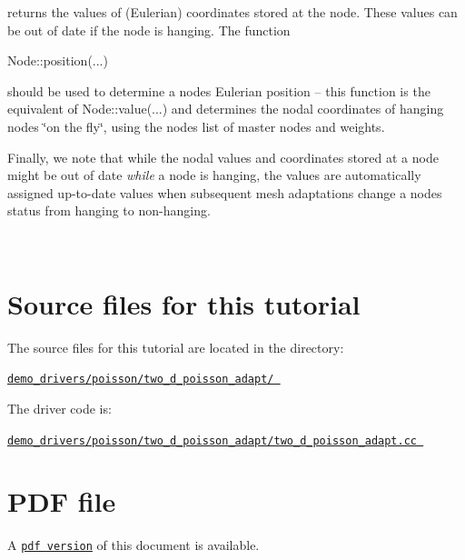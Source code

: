 \begin{longtabu}
returns the values of (Eulerian) coordinates stored at the node. These values can be out of date if the node is hanging. The function


\begin{DoxyCode}
Node::position(...)
\end{DoxyCode}


should be used to determine a node\textquotesingle{}s Eulerian position -- this function is the equivalent of {\ttfamily Node\+::value}(...) and determines the nodal coordinates of hanging nodes \char`\"{}on the fly\char`\"{}, using the node\textquotesingle{}s list of master nodes and weights.

Finally, we note that while the nodal values and coordinates stored at a node might be out of date {\itshape while} a node is hanging, the values are automatically assigned up-\/to-\/date values when subsequent mesh adaptations change a node\textquotesingle{}s status from hanging to non-\/hanging.

\\
\end{longtabu}




 

\hypertarget{index_sources}{}\section{Source files for this tutorial}\label{index_sources}

\begin{DoxyItemize}
\item The source files for this tutorial are located in the directory\+: \begin{center} \href{../../../../demo_drivers/poisson/two_d_poisson_adapt/}{\tt demo\+\_\+drivers/poisson/two\+\_\+d\+\_\+poisson\+\_\+adapt/ } \end{center} 
\item The driver code is\+: \begin{center} \href{../../../../demo_drivers/poisson/two_d_poisson_adapt/two_d_poisson_adapt.cc}{\tt demo\+\_\+drivers/poisson/two\+\_\+d\+\_\+poisson\+\_\+adapt/two\+\_\+d\+\_\+poisson\+\_\+adapt.\+cc } \end{center} 
\end{DoxyItemize}

 

 \hypertarget{index_pdf}{}\section{P\+D\+F file}\label{index_pdf}
A \href{../latex/refman.pdf}{\tt pdf version} of this document is available. 
